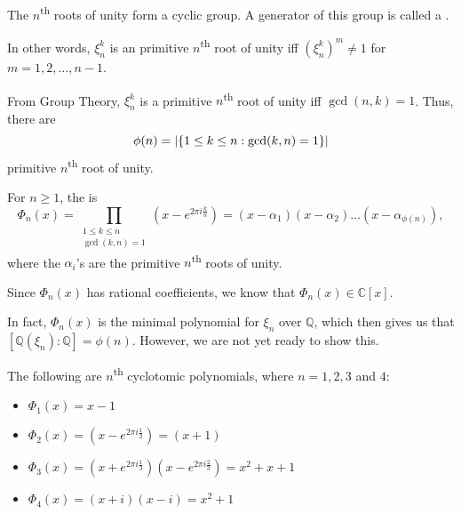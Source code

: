 \documentclass[notoc,notitlepage]{tufte-book}
\begin{document}
\begin{remark}
  The $n$\textsuperscript{th} roots of unity form a cyclic group. A generator of this
  group is called a .

  In other words, $\xi_n^k$ is an primitive $n$\textsuperscript{th} root of unity iff
  $(\xi_n^k)^m \neq 1$ for $m = 1, 2, \ldots, n - 1$.

  From Group Theory, $\xi_n^k$ is a primitive $n$\textsuperscript{th} root of unity iff
  $\gcd(n, k) = 1$. Thus, there are
  \begin{equation*}
    \phi(n) = \left| \{ 1 \leq k \leq n : \gcd(k, n) = 1 \} \right|
  \end{equation*}
  primitive $n$\textsuperscript{th} root of unity.
\end{remark}

\begin{defn}\label{defn:_n_th_cyclotomic_polynomial}
  For $n \geq 1$, the  is
  \begin{equation*}
    \Phi_n(x) = \prod_{\substack{1 \leq k \leq n \\ \gcd(k, n) = 1}} \left( x - e^{2 \pi i
    \frac{k}{n}} \right) = (x - \alpha_1)(x - \alpha_2) \hdots (x - \alpha_{\phi(n)}),
  \end{equation*}
  where the $\alpha_i$'s are the primitive $n$\textsuperscript{th} roots of unity.
\end{defn}

\begin{remark}
  Since $\Phi_n(x)$ has rational coefficients, we know that $\Phi_n(x) \in \mathbb{C}[x]$.
\end{remark}

In fact, $\Phi_n(x)$ is the minimal polynomial for $\xi_n$ over $\mathbb{Q}$, which then
gives us that $[ \mathbb{Q}(\xi_n) : \mathbb{Q} ] = \phi(n)$. However, we are not yet
ready to show this.

\begin{eg}
  The following are $n$\textsuperscript{th} cyclotomic polynomials, where $n = 1, 2, 3$
  and $4$:
  \begin{itemize}
    \item $\Phi_1(x) = x - 1$
    \item $\Phi_2(x) = \left(x - e^{2 \pi i \frac{1}{2}}\right) = (x + 1)$
    \item $\Phi_3(x) = \left(x + e^{2 \pi i \frac{1}{3}}\right)\left(x - e^{2 \pi i
      \frac{2}{3}}\right) =  x^2 + x + 1$
    \item $\Phi_4(x) = (x + i)(x - i) = x^2 + 1$
  \end{itemize}
\end{eg}
\end{document}
